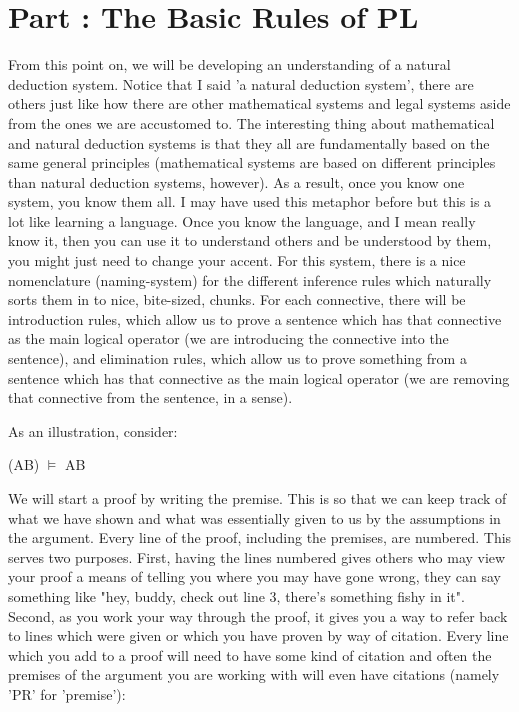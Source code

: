 \chapter{Part \thechapcount: The Basic Rules of PL}
From this point on, we will be developing an understanding of a natural deduction system. Notice that I said 'a natural deduction system', there are others just like how there are other mathematical systems and legal systems aside from the ones we are accustomed to. The interesting thing about mathematical and natural deduction systems is that they all are fundamentally based on the same general principles (mathematical systems are based on different principles than natural deduction systems, however). As a result, once you know one system, you know them all. I may have used this metaphor before but this is a lot like learning a language. Once you know the language, and I mean really know it, then you can use it to understand others and be understood by them, you might just need to change your accent. For this system, there is a nice nomenclature (naming-system) for the different inference rules which naturally sorts them in to nice, bite-sized, chunks. For each connective, there will be introduction rules, which allow us to prove a sentence which has that connective as the main logical operator (we are introducing the connective into the sentence), and elimination rules, which allow us to prove something from a sentence which has that connective as the main logical operator (we are removing that connective from the sentence, in a sense).

As an illustration, consider:
\begin{center}
\enot (A\eor B) $\vDash$ \enot A\eand  \enot B
\end{center}
We will start a proof by writing the premise. This is so that we can keep track of what we have shown and what was essentially given to us by the assumptions in the argument. Every line of the proof, including the premises, are numbered. This serves two purposes. First, having the lines numbered gives others who may view your proof a means of telling you where you may have gone wrong, they can say something like "hey, buddy, check out line 3, there's something fishy in it". Second, as you work your way through the proof, it gives you a way to refer back to lines which were given or which you have proven by way of citation. Every line which you add to a proof will need to have some kind of citation and often the premises of the argument you are working with will even have citations (namely 'PR' for 'premise'):

